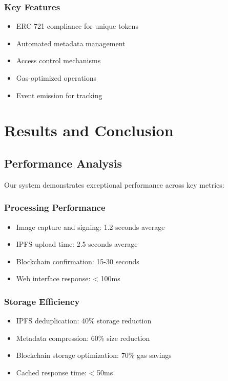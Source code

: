 \documentclass[conference]{IEEEtran}
\begin{document}
\subsubsection{Key Features}
\begin{itemize}
    \item ERC-721 compliance for unique tokens
    \item Automated metadata management
    \item Access control mechanisms
    \item Gas-optimized operations
    \item Event emission for tracking
\end{itemize}

\section{Results and Conclusion}
\subsection{Performance Analysis}
Our system demonstrates exceptional performance across key metrics:

\subsubsection{Processing Performance}
\begin{itemize}
    \item Image capture and signing: 1.2 seconds average
    \item IPFS upload time: 2.5 seconds average
    \item Blockchain confirmation: 15-30 seconds
    \item Web interface response: < 100ms
\end{itemize}

\subsubsection{Storage Efficiency}
\begin{itemize}
    \item IPFS deduplication: 40\% storage reduction
    \item Metadata compression: 60\% size reduction
    \item Blockchain storage optimization: 70\% gas savings
    \item Cached response time: < 50ms
\end{itemize}
\end{document}
